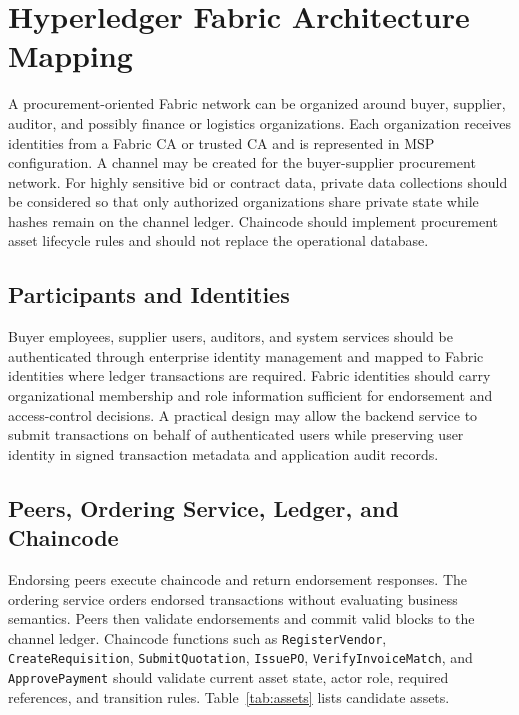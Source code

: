 \documentclass[conference]{IEEEtran}
\begin{document}
\section{Hyperledger Fabric Architecture Mapping}
A procurement-oriented Fabric network can be organized around buyer, supplier, auditor, and possibly finance or logistics organizations. Each organization receives identities from a Fabric CA or trusted CA and is represented in MSP configuration. A channel may be created for the buyer-supplier procurement network. For highly sensitive bid or contract data, private data collections should be considered so that only authorized organizations share private state while hashes remain on the channel ledger. Chaincode should implement procurement asset lifecycle rules and should not replace the operational database.

\subsection{Participants and Identities}
Buyer employees, supplier users, auditors, and system services should be authenticated through enterprise identity management and mapped to Fabric identities where ledger transactions are required. Fabric identities should carry organizational membership and role information sufficient for endorsement and access-control decisions. A practical design may allow the backend service to submit transactions on behalf of authenticated users while preserving user identity in signed transaction metadata and application audit records.

\subsection{Peers, Ordering Service, Ledger, and Chaincode}
Endorsing peers execute chaincode and return endorsement responses. The ordering service orders endorsed transactions without evaluating business semantics. Peers then validate endorsements and commit valid blocks to the channel ledger. Chaincode functions such as \texttt{RegisterVendor}, \texttt{CreateRequisition}, \texttt{SubmitQuotation}, \texttt{IssuePO}, \texttt{VerifyInvoiceMatch}, and \texttt{ApprovePayment} should validate current asset state, actor role, required references, and transition rules. Table~\ref{tab:assets} lists candidate assets.
\end{document}
